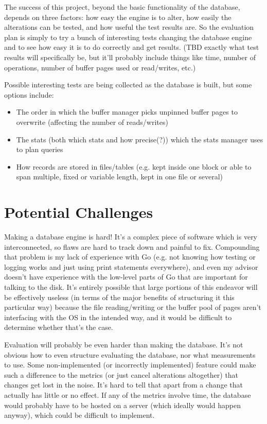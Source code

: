 \documentclass[12pt, oneside]{amsart} %
\begin{document}
The success of this project, beyond the basic functionality of the database, depends on three factors: how easy the engine is to alter, how easily the alterations can be tested, and how useful the test results are. So the evaluation plan is simply to try a bunch of interesting tests changing the database engine and to see how easy it is to do correctly and get results. (TBD exactly what test results will specifically be, but it'll probably include things like time, number of operations, number of buffer pages used or read/writes, etc.) 

Possible interesting tests are being collected as the database is built, but some options include: 
\begin{itemize}
    \item The order in which the buffer manager picks unpinned buffer pages to overwrite (affecting the number of reads/writes)
    \item The stats (both which stats and how precise(?)) which the stats manager uses to plan queries
    \item How records are stored in files/tables (e.g. kept inside one block or able to span multiple, fixed or variable length, kept in one file or several)
\end{itemize}


\section{Potential Challenges}

Making a database engine is hard! It's a complex piece of software which is very interconnected, so flaws are hard to track down and painful to fix. Compounding that problem is my lack of experience with Go (e.g. not knowing how testing or logging works and just using print statements everywhere), and even my advisor doesn't have experience with the low-level parts of Go that are important for talking to the disk. It's entirely possible that large portions of this endeavor will be effectively useless (in terms of the major benefits of structuring it this particular way) because the file reading/writing or the buffer pool of pages aren't interfacing with the OS in the intended way, and it would be difficult to determine whether that's the case. 

Evaluation will probably be even harder than making the database. It's not obvious how to even structure evaluating the database, nor what measurements to use. Some non-implemented (or incorrectly implemented) feature could make such a difference to the metrics (or just cancel alterations altogether) that changes get lost in the noise. It's hard to tell that apart from a change that actually has little or no effect. If any of the metrics involve time, the database would probably have to be hosted on a server (which ideally would happen anyway), which could be difficult to implement. 
\end{document}
